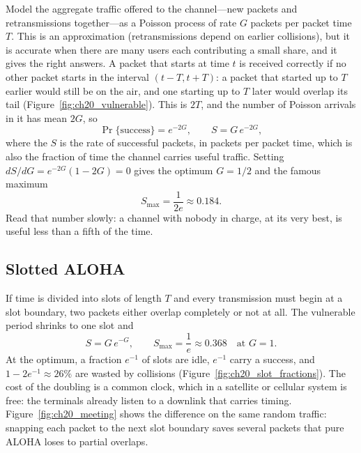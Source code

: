 Model the aggregate traffic offered to the channel---new packets and retransmissions together---as a
Poisson process of rate $G$ packets per packet time $T$. This is an approximation (retransmissions
depend on earlier collisions), but it is accurate when there are many users each contributing a small
share, and it gives the right answers. A packet that starts at time $t$ is received correctly if no
other packet starts in the interval $(t-T,t+T)$: a packet that started up to $T$ earlier would still
be on the air, and one starting up to $T$ later would overlap its tail (Figure~\ref{fig:ch20_vulnerable}).
This  is $2T$, and the number of Poisson arrivals in it has mean $2G$, so
\begin{equation}
\Pr\{\text{success}\}=e^{-2G},\qquad S=G\,e^{-2G},
\label{eq:ch20:pure}
\end{equation}
where the  $S$ is the rate of successful packets, in packets per packet time, which is
also the fraction of time the channel carries useful traffic. Setting $dS/dG=e^{-2G}(1-2G)=0$ gives the
optimum $G=1/2$ and the famous maximum
\begin{equation}
S_{\max}=\frac{1}{2e}\approx0.184 .
\end{equation}
Read that number slowly: a channel with nobody in charge, at its very best, is useful less than a
fifth of the time.

\subsection{Slotted ALOHA}

If time is divided into slots of length $T$ and every transmission must begin at a slot boundary, two
packets either overlap completely or not at all. The vulnerable period shrinks to one slot and
\begin{equation}
S=G\,e^{-G},\qquad S_{\max}=\frac1e\approx0.368\quad\text{at } G=1.
\label{eq:ch20:slotted}
\end{equation}
At the optimum, a fraction $e^{-1}$ of slots are idle, $e^{-1}$ carry a success, and
$1-2e^{-1}\approx26\%$ are wasted by collisions (Figure~\ref{fig:ch20_slot_fractions}). The cost of the
doubling is a common clock, which in a satellite or cellular system is free: the terminals already
listen to a downlink that carries timing. Figure~\ref{fig:ch20_meeting} shows the difference on the
same random traffic: snapping each packet to the next slot boundary saves several packets that pure
ALOHA loses to partial overlaps.

